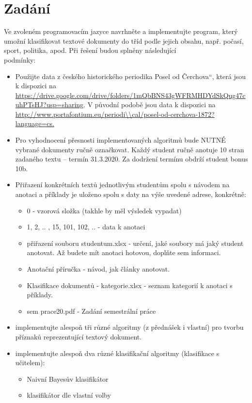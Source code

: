 \documentclass[ 12pt, a4paper]{article}
\begin{document}
\section{Zadání}
Ve zvoleném programovacím jazyce navrhněte a implementujte program, který umožní klasifikovat textové dokumenty do tříd podle jejich obsahu, např. počasí, sport, politika, apod. Při řešení budou splněny následující \\
podmínky:
\begin{itemize}
	
\item Použijte data z českého historického periodika Posel od Čerchova“, která jsou k dispozici na \url{https://drive.google.com/drive/folders/1mQbBNS43gWFRMHDYdSkQug47cuhPTsHJ?usp=sharing}. V původní podobě jsou data k dispozici na \url{http://www.portafontium.eu/periodi\\cal/posel-od-cerchova-1872?language=cs.}

\item Pro vyhodnocení přesnosti implementovaných algoritmů bude NUTNÉ vybrané dokumenty ručně označkovat. Každý student ručně anotuje 10 stran zadaného textu –
termín 31.3.2020. Za dodržení termínu obdrží student bonus 10b.

\item Přiřazení konkrétních textů jednotlivým studentům spolu s návodem na anotaci a příklady je uloženo spolu s daty na výše uvedené adrese, konkrétně:
	\begin{itemize}
	\item 0 - vzorová složka (takhle by měl výsledek vypadat)
	\item 1, 2, .. , 15, 101, 102, .. - data k anotaci
	\item přiřazení souboru studentum.xlsx - určení, jaké soubory má jaký student	anotovat. Až budete mít anotaci hotovou, doplňte sem informaci.
	\item Anotační příručka - návod, jak články anotovat.
	\item Klasifikace dokumentů - kategorie.xlsx - seznam kategorií k anotaci s příklady.
	\item sem prace20.pdf - Zadání semestrální práce
	\end{itemize}

\item implementujte alespoň tři různé algoritmy (z přednášek i vlastní) pro tvorbu příznaků reprezentující textový dokument.

\item implementujte alespoň dva různé klasifikační algoritmy (klasifikace s učitelem):
	\begin{itemize}
	\item Naivní Bayesův klasifikátor
	\item klasifikátor dle vlastní volby
	\end{itemize}


\end{itemize}
\end{document}

